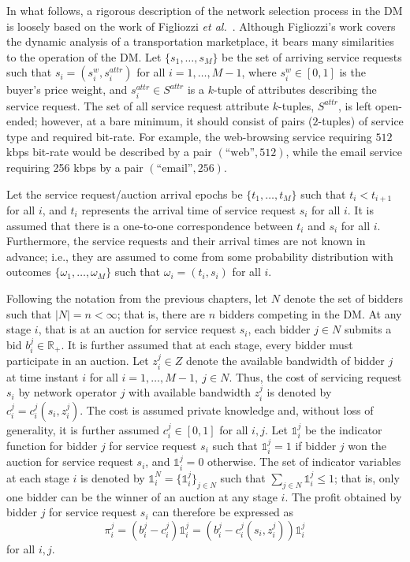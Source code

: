 In what follows, a rigorous description of the network selection process in the DM is loosely based on the work of Figliozzi \emph{et al.}~\cite{FigliozziJaillet2008}. Although Figliozzi's work covers the dynamic analysis of a transportation marketplace, it bears many similarities to the operation of the DM. Let $\{s_1,\ldots,s_M\}$ be the set of arriving service requests such that $s_i = (s^w_i, s^{attr}_i)$ for all $i=1,\ldots,M-1$, where $s^w_i\in [0,1]$ is the buyer's price weight, and $s^{attr}_i\in S^{attr}$ is a $k$-tuple of attributes describing the service request. The set of all service request attribute $k$-tuples, $S^{attr}$, is left open-ended; however, at a bare minimum, it should consist of pairs ($2$-tuples) of service type and required bit-rate. For example, the web-browsing service requiring $512$ kbps bit-rate would be described by a pair $(\text{``web''}, 512)$, while the email service requiring 256 kbps by a pair $(\text{``email''}, 256)$.

Let the service request/auction arrival epochs be $\{t_1,\ldots,t_M\}$ such that $t_i < t_{i+1}$ for all $i$, and $t_i$ represents the arrival time of service request $s_i$ for all $i$. It is assumed that there is a one-to-one correspondence between $t_i$ and $s_i$ for all $i$. Furthermore, the service requests and their arrival times are not known in advance; i.e., they are assumed to come from some probability distribution with outcomes $\{\omega_1,\ldots,\omega_M\}$ such that $\omega_i = (t_i, s_i)$ for all $i$.

Following the notation from the previous chapters, let $N$ denote the set of bidders such that $|N| = n < \infty$; that is, there are $n$ bidders competing in the DM. At any stage $i$, that is at an auction for service request $s_i$, each bidder $j\in N$ submits a bid $b^j_i\in\mathbb{R}_+$. It is further assumed that at each stage, every bidder must participate in an auction. Let $z^j_i\in Z$ denote the available bandwidth of bidder $j$ at time instant $i$ for all $i=1,\ldots,M-1,\: j\in N$. Thus, the cost of servicing request $s_i$ by network operator $j$ with available bandwidth $z^j_i$ is denoted by $c^j_i = c^j_i(s_i,z^j_i)$. The cost is assumed private knowledge and, without loss of generality, it is further assumed $c^j_i\in [0,1]$ for all $i,j$. Let $\mathds{1}^j_i$ be the indicator function for bidder $j$ for service request $s_i$ such that $\mathds{1}^j_i=1$ if bidder $j$ won the auction for service request $s_i$, and $\mathds{1}^j_i=0$ otherwise. The set of indicator variables at each stage $i$ is denoted by $\mathds{1}^N_i=\{\mathds{1}^j_i\}_{j\in N}$ such that $\sum_{j\in N}\mathds{1}^j_i\le 1$; that is, only one bidder can be the winner of an auction at any stage $i$. The profit obtained by bidder $j$ for service request $s_i$ can therefore be expressed as
\begin{equation*}
  \pi^j_i = \left(b^j_i - c^j_i\right)\mathds{1}^j_i = \left(b^j_i - c^j_i(s_i, z^j_i)\right)\mathds{1}^j_i
\end{equation*}
for all $i,j$.

